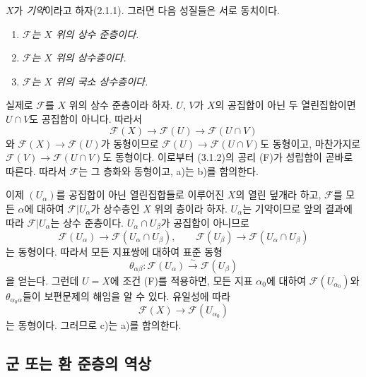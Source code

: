 \begin{env}[3.6.2]
\label{0.3.6.2-ko}
$X$가 \emph{기약}이라고 하자(2.1.1). 그러면 다음 성질들은 서로 동치이다.
\begin{enumerate}
  \item[a)] \emph{$\mathcal F$는 $X$ 위의 상수 준층이다.}
  \item[b)] \emph{$\mathcal F$는 $X$ 위의 상수층이다.}
  \item[c)] \emph{$\mathcal F$는 $X$ 위의 국소 상수층이다.}
\end{enumerate}

실제로 $\mathcal F$를 $X$ 위의 상수 준층이라 하자. $U$, $V$가 $X$의 공집합이 아닌 두 열린집합이면 $U\cap V$도 공집합이 아니다. 따라서
\[
  \mathcal F(X)\longrightarrow\mathcal F(U)
  \longrightarrow\mathcal F(U\cap V)
\]
와 $\mathcal F(X)\to\mathcal F(U)$가 동형이므로 $\mathcal F(U)\to\mathcal F(U\cap V)$도 동형이고, 마찬가지로 $\mathcal F(V)\to\mathcal F(U\cap V)$도 동형이다. 이로부터 (3.1.2)의 공리 (F)가 성립함이 곧바로 따른다. 따라서 $\mathcal F$는 그 층화와 동형이고, a)는 b)를 함의한다.

이제 $(U_\alpha)$를 공집합이 아닌 열린집합들로 이루어진 $X$의 열린 덮개라 하고, $\mathcal F$를 모든 $\alpha$에 대하여 $\mathcal F|U_\alpha$가 상수층인 $X$ 위의 층이라 하자. $U_\alpha$는 기약이므로 앞의 결과에 따라 $\mathcal F|U_\alpha$는 상수 준층이다. $U_\alpha\cap U_\beta$가 공집합이 아니므로
\[
  \mathcal F(U_\alpha)\longrightarrow
  \mathcal F(U_\alpha\cap U_\beta),
  \qquad
  \mathcal F(U_\beta)\longrightarrow
  \mathcal F(U_\alpha\cap U_\beta)
\]
는 동형이다. 따라서 모든 지표쌍에 대하여 표준 동형
\[
  \theta_{\alpha\beta}:
  \mathcal F(U_\alpha)\xrightarrow{\sim}\mathcal F(U_\beta)
\]
을 얻는다. 그런데 $U=X$에 조건 (F)를 적용하면, 모든 지표 $\alpha_0$에 대하여 $\mathcal F(U_{\alpha_0})$와 $\theta_{\alpha_0\alpha}$들이 보편문제의 해임을 알 수 있다. 유일성에 따라
\[
  \mathcal F(X)\longrightarrow\mathcal F(U_{\alpha_0})
\]
는 동형이다. 그러므로 c)는 a)를 함의한다.
\end{env}

\subsection{군 또는 환 준층의 역상}
\label{subsection:0.3.7-ko}


